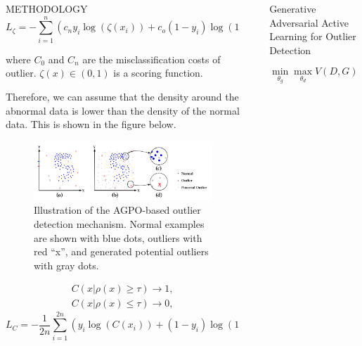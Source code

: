 \documentclass[final]{beamer}
\newlength{\sepwidth}
\newlength{\colwidth}
\newcommand{\separatorcolumn}{\begin{column}{\sepwidth}\end{column}}
\begin{document}
\begin{frame}[t]
\begin{columns}[t]
\begin{column}{\colwidth}
\begin{alertblock}{METHODOLOGY}
	$$
	L_{\zeta}= -\sum_{i=1}^{n}(c_ny_i\log(\zeta(x_i))+c_o(1-y_i)\log(1-\zeta(x_i)))
	$$
	
	where $C_0$ and $C_n$ are the misclassification costs of outlier. $\zeta(x)\in(0,1)$ is a scoring function.
	
	Therefore, we can assume that the density around the abnormal data is lower than the density of the normal data. This is shown in the figure below.
	
	\begin{figure}
		\centering
		\includegraphics{figures/figure 1.png}
		\caption{Illustration of the AGPO-based outlier detection mechanism. Normal examples are shown with blue dots, outliers with red “x”, and generated potential outliers with gray dots. }
	\end{figure}

	\begin{equation}\nonumber
		\begin{aligned}
			C(x|\rho(x)\geq\tau)\rightarrow1,\\
			C(x|\rho(x)\leq\tau)\rightarrow0,
		\end{aligned}
	\end{equation}
	$$
	L_C= -\frac{1}{2n}\sum_{i=1}^{2n}(y_i\log(C(x_i))+(1-y_i)\log(1-C(x_i)))
	$$
  \end{alertblock}

\end{column}

\separatorcolumn

\begin{column}{\colwidth}

  \begin{exampleblock}{Generative Adversarial Active Learning for Outlier Detection}
  	
  
   
  	$$
  	\min_{\theta_g}\max_{\theta_d}V(D,G)=\mathbb{E}_{x~p_{data}}[\log D(x)]+\mathbb{E}_{z~p_{z}}[\log(1-D(x))]
  	$$
  	

\end{exampleblock}
\end{column}
\end{columns}
\end{frame}
\end{document}
